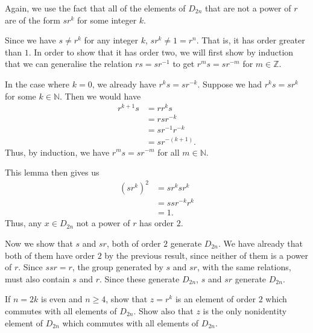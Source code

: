 \documentclass[12 pt, letterpaper]{hmcpset}
\begin{document}
\begin{solution}
	Again, we use the fact that all of the elements of $D_{2n}$ that are not a power of $r$ are of the form $s r^k$ for some integer $k$.

	Since we have $s \neq r^k$ for any integer $k$, $s r^k \neq 1 = r^n$. That is, it has order greater than $1$. In order to show that it has order two, we will first show by induction that we can generalise the relation $r s = s r^{-1}$ to get $r^m s = s r^{-m}$ for $m \in \mathbb Z$. 

	In the case where $k = 0$, we already have $r^k s = s r^{-k}$. Suppose we had $r^k s = s r^k$ for some $k \in \mathbb N$. Then we would have
	\[
		\begin{split}
			r^{k + 1} s & = r r^k s \\
				    & = r s r^{-k} \\
				    & = s r^{-1} r^{-k} \\
				    & = s r^{-(k + 1)}.
		\end{split}
	\]
	Thus, by induction, we have $r^m s = s r^{-m}$ for all $m \in \mathbb N$. 

	This lemma then gives us
	\[
		\begin{split}
			(s r^k)^2 & = s r^k s r^k \\
				  & = s s r^{-k} r^k \\
				  & = 1.
		\end{split}
	\]
	Thus, any $x \in D_{2n}$ not a power of $r$ has order $2$. 

	Now we show that $s$ and $sr$, both of order $2$ generate $D_{2n}$. We have already that both of them have order $2$ by the previous result, since neither of them is a power of $r$. Since $s s r = r$, the group generated by $s$ and $sr$, with the same relations, must also contain $s$ and $r$. Since these generate $D_{2n}$, $s$ and $s r$ generate $D_{2n}$.
\end{solution}

\pagebreak

\begin{problem}
	If $n = 2k$ is even and $n \ge 4$, show that $z = r^k$ is an element of order $2$ which commutes with all elements of $D_{2n}$. Show also that $z$ is the only nonidentity element of $D_{2n}$ which commutes with all elements of $D_{2n}$.
\end{problem}
\end{document}
